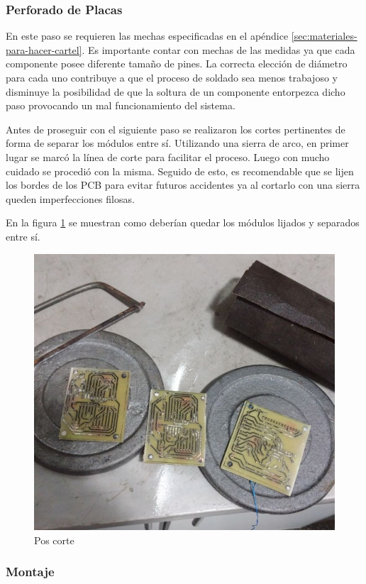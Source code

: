 \subsubsection{Perforado de Placas}
En este paso se requieren las mechas especificadas en el apéndice \ref{sec:materiales-para-hacer-cartel}. Es importante contar con mechas de las medidas ya que cada componente posee diferente tamaño de pines. La correcta elección de diámetro para cada uno contribuye a que el proceso de soldado sea menos trabajoso y disminuye la posibilidad de que la soltura de un componente entorpezca dicho paso provocando un mal funcionamiento del sistema.

Antes de proseguir con el siguiente paso se realizaron los cortes pertinentes de forma de separar los módulos entre sí. Utilizando una sierra de arco, en primer lugar se marcó la línea de corte para facilitar el proceso.
Luego con mucho cuidado se procedió con la misma. Seguido de esto, es recomendable que se lijen los bordes de los PCB para evitar futuros accidentes ya al cortarlo con una sierra queden imperfecciones filosas.

En la figura \ref{fig:pos-corte} se muestran como deberían quedar los módulos lijados y separados entre sí.

\begin{figure}[ht!]
	\centering
	\includegraphics[width=0.7\linewidth]{imagenes/pcbeando/pos-corte.jpeg}
	\caption{Pos corte}
	\label{fig:pos-corte}
\end{figure}

\subsubsection{Montaje}

